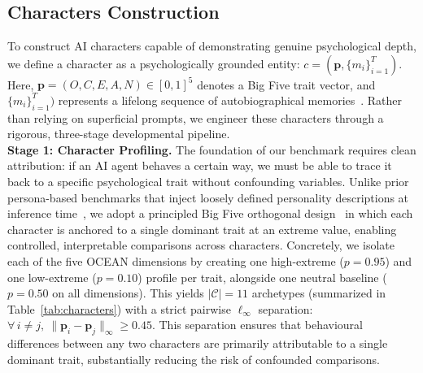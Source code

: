 \documentclass{article}
\begin{document}
\subsection{Characters Construction}
\label{sec:character}

To construct AI characters capable of demonstrating genuine psychological depth, we define a character as a psychologically grounded entity: \(c=(\mathbf{p}, \{m_i\}_{i=1}^{T})\). Here,
$\mathbf{p} = (O, C, E, A, N) \in [0,1]^5$ denotes a Big Five trait vector, and \(\{m_i\}_{i=1}^{T})\) represents a lifelong sequence of autobiographical memories~\cite{singer1995seeing}. 
Rather than relying on superficial prompts, we engineer these characters through a rigorous, three-stage developmental pipeline.\\
\textbf{Stage 1: Character Profiling.}
The foundation of our benchmark requires clean attribution: if an AI agent behaves a certain way, we must be able to trace it back to a specific psychological trait without confounding variables. Unlike prior persona-based benchmarks that inject loosely defined personality descriptions at inference time~\citep{shao2023character,jiang2024personallm}, we adopt a principled Big Five orthogonal design~\citep{mccrae1992introduction} in which each character is anchored to a single dominant trait at an extreme value, enabling controlled, interpretable comparisons across characters.
Concretely, we isolate each of the five OCEAN dimensions by creating one high-extreme ($p = 0.95$) and one low-extreme ($p = 0.10$) profile per trait, alongside one neutral baseline ($p = 0.50$ on all dimensions). This yields $|\mathcal{C}| = 11$ archetypes (summarized in Table~\ref{tab:characters}) with a strict pairwise $\ell_\infty$ separation: $\forall\, i \neq j,\ \|\mathbf{p}_i - \mathbf{p}_j\|_\infty \geq 0.45$.
This separation ensures that behavioural differences between any two characters are primarily attributable to a single dominant trait, substantially reducing the risk of confounded comparisons.
\end{document}
